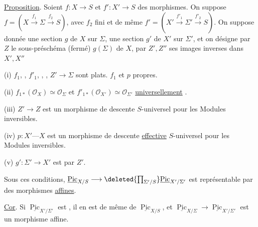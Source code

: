 \uline{Proposition}. Soient $f:X\longrightarrow S$ et $f':X'\longrightarrow S$ des morphismes. On suppose $f=(X\xrightarrow{f_1}\Sigma\xrightarrow{f_2}S)$, avec $f_2$ fini  et de même $f'=(X'\xrightarrow{f'_1}\Sigma'\xrightarrow{f'_2}S)$. On suppose donnée une section $g$ de $X$ sur $\Sigma$, une section $g'$ de $X'$ sur $\Sigma'$, et on désigne par $Z$ le sous-préschéma (fermé) $g(\Sigma)$ de $X$, par $Z',Z''$ ses images  inverses dans $X',X''$  

(i)  $f_1$, \deleted{$\unsure{\Sigma}$}, $f'_1$, , \deleted{$[\unsure{f_2,f'_2}]$}, $Z'\longrightarrow\Sigma$ sont plats.  $f_1$ et $p$ propres.

(ii) $f_{1*}(\mathcal O_X)\simeq\mathcal O_\Sigma$ et $f'_{1*}(\mathcal O_{X'})\simeq\mathcal O_{\Sigma'}$ \uline{universellement} .

(iii) $Z'\longrightarrow Z$ est un morphisme de descente $S$-universel pour les Modules inversibles.

(iv) $p:X'\text{---}X$ est un morphisme de descente \uline{effective} $S$-universel pour les Modules inversibles.

(v)  $g':\Sigma'\longrightarrow X'$ est  par $Z'$.

Sous ces conditions, $\underline{\operatorname{Pic}}_{X/S}\longrightarrow \deleted{\prod_{\Sigma'/S}}\underline{\operatorname{Pic}}_{X'/\Sigma'}$ est représentable par des morphismes \uline{affines}.

\uline{Cor}. Si $\underline{\operatorname{Pic}}_{X'/\Sigma'}$ est , il en est de même de $\underline{\operatorname{Pic}}_{X/S}$, et $\underline{\operatorname{Pic}}_{X/\Sigma}\longrightarrow\underline{\operatorname{Pic}}_{X'/\Sigma'}$ est un morphisme affine.


